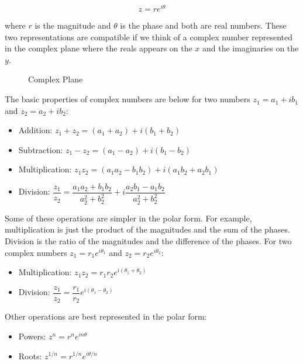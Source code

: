 \[z = r e^{i\theta}\]

where \(r\) is the magnitude and \(\theta\) is the phase and both are
real numbers. These two representations are compatible if we think of a
complex number represented in the complex plane where the reals appears
on the \(x\) and the imaginaries on the \(y\).

\begin{figure}
\centering
{}
\caption{Complex Plane}
\end{figure}

The basic properties of complex numbers are below for two numbers
\(z_1 = a_1 + ib_1\) and \(z_2 = a_2 + ib_2\):

\begin{itemize}
\tightlist
\item
  Addition: \(z_1 + z_2 = (a_1 + a_2) + i(b_1 + b_2)\)
\item
  Subtraction: \(z_1 - z_2 = (a_1 - a_2) + i(b_1 - b_2)\)
\item
  Multiplication:
  \(z_1 z_2 = (a_1 a_2 - b_1 b_2) + i(a_1 b_2 + a_2 b_1)\)
\item
  Division:
  \(\dfrac{z_1}{z_2} = \dfrac{a_1 a_2 + b_1 b_2}{a_2^2 + b_2^2} + i\dfrac{a_2 b_1 - a_1 b_2}{a_2^2 + b_2^2}\)
\end{itemize}

Some of these operations are simpler in the polar form. For example,
multiplication is just the product of the magnitudes and the sum of the
phases. Division is the ratio of the magnitudes and the difference of
the phases. For two complex numbers \(z_1 = r_1 e^{i\theta_1}\) and
\(z_2 = r_2 e^{i\theta_2}\):

\begin{itemize}
\tightlist
\item
  Multiplication: \(z_1 z_2 = r_1 r_2 e^{i(\theta_1 + \theta_2)}\)
\item
  Division:
  \(\dfrac{z_1}{z_2} = \dfrac{r_1}{r_2} e^{i(\theta_1 - \theta_2)}\)
\end{itemize}

Other operations are best represented in the polar form:

\begin{itemize}
\tightlist
\item
  Powers: \(z^n = r^n e^{in\theta}\)
\item
  Roots: \(z^{1/n} = r^{1/n} e^{i\theta/n}\)
\end{itemize}

